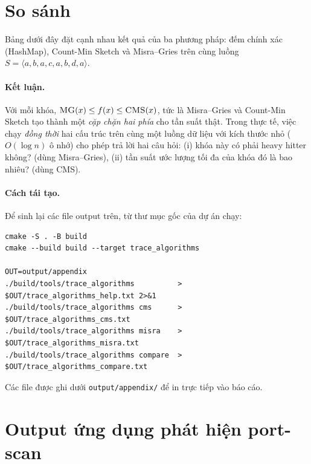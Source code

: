 \section{So sánh}
\label{sec:trace:compare}

Bảng dưới đây đặt cạnh nhau kết quả của ba phương pháp: đếm chính xác
(HashMap), Count-Min Sketch và Misra--Gries trên cùng luồng
$S = \langle a, b, a, c, a, b, d, a \rangle$.



\paragraph{Kết luận.}
Với mỗi khóa, $\textsc{MG}(x) \le f(x) \le \textsc{CMS}(x)$, tức là
Misra--Gries và Count-Min Sketch tạo thành một \emph{cặp chặn hai phía}
cho tần suất thật. Trong thực tế, việc chạy \emph{đồng thời} hai cấu
trúc trên cùng một luồng dữ liệu với kích thước nhỏ ($O(\log n)$ ô
nhớ) cho phép trả lời hai câu hỏi: (i) khóa này có phải heavy hitter
không? (dùng Misra--Gries), (ii) tần suất ước lượng tối đa của khóa
đó là bao nhiêu? (dùng CMS).

\paragraph{Cách tái tạo.}
Để sinh lại các file output trên, từ thư mục gốc của dự án chạy:

\begin{lstlisting}[style=pseudo, basicstyle=\ttfamily\scriptsize, breaklines=true,
                   breakatwhitespace=false, columns=fullflexible, frame=single]
cmake -S . -B build
cmake --build build --target trace_algorithms

OUT=output/appendix
./build/tools/trace_algorithms          > $OUT/trace_algorithms_help.txt 2>&1
./build/tools/trace_algorithms cms      > $OUT/trace_algorithms_cms.txt
./build/tools/trace_algorithms misra    > $OUT/trace_algorithms_misra.txt
./build/tools/trace_algorithms compare  > $OUT/trace_algorithms_compare.txt
\end{lstlisting}

\noindent Các file được ghi dưới \texttt{output/appendix/} để in trực tiếp vào báo cáo.

\section{Output ứng dụng phát hiện port-scan}
\label{sec:trace:portscan-output}


